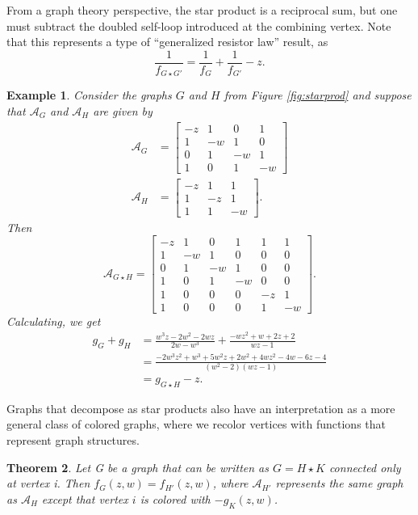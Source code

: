 \documentclass[12pt]{amsart}
\newtheorem{theorem}{Theorem}[section]
\newtheorem{example}[theorem]{Example}
\theoremstyle{remark}
\newcommand{\A}{\mathcal{A}}
\numberwithin{equation}{section}
\begin{document}
From a graph theory perspective, the star product is a reciprocal sum, but one must subtract the doubled self-loop introduced at the combining vertex. Note that this represents a type of ``generalized resistor law'' result, as
\[
\frac{1}{f_{G \star G'}} = \frac{1}{f_G} + \frac{1}{f_{G'}} -z.
\]


\begin{example}
Consider the graphs $G$ and $H$ from Figure \ref{fig:starprod} and suppose that $\A_G$ and $\A_H$ are given by 
\begin{align*}
\A_G &= \left[\begin{smallmatrix} -z & 1 & 0 & 1 \\ 1 & -w & 1 & 0 \\ 0 & 1 & -w & 1 \\ 1 & 0 & 1 & -w \end{smallmatrix}\right] \\
\A_H &= \left[\begin{smallmatrix} -z & 1 & 1 \\ 1 & -z & 1 \\ 1 & 1 & -w \end{smallmatrix}\right].
\end{align*}
Then
\[
\A_{G \star H} = \left[ \begin{smallmatrix} -z & 1 & 0 & 1 & 1 & 1 \\ 1 & -w & 1 & 0 & 0 & 0  \\ 0 & 1 & -w & 1 & 0 & 0 \\ 1 & 0 & 1 & -w & 0 & 0 \\ 1 & 0 & 0 & 0 & -z & 1 \\ 1 & 0 & 0 & 0 & 1 & -w \end{smallmatrix} \right].
\]
Calculating, we get
\begin{align*}
g_G + g_H &= \frac{w^3 z-2 w^2-2 w z}{2 w-w^3} + \frac{-w z^2+w+2 z+2}{w z-1} \\
&= \frac{-2 w^3 z^2+w^3+5 w^2 z+2 w^2+4 w z^2-4 w-6 z-4}{\left(w^2-2\right) (w z-1)} \\
&= g_{G\star H} - z.
\end{align*}
\end{example}

Graphs that decompose as star products also have an interpretation as a more general class of colored graphs, where we recolor vertices with functions that represent graph structures.

\begin{theorem}\label{thm_retract}
    Let G be a graph that can be written as $G = H \star K$ connected only at vertex i. Then $f_G(z,w) = f_{H'}(z,w)$, where $\A_{H'}$ represents the same graph as $\A_H$ except that vertex $i$ is colored with $-g_K(z,w)$. 
\end{theorem}
\end{document}
